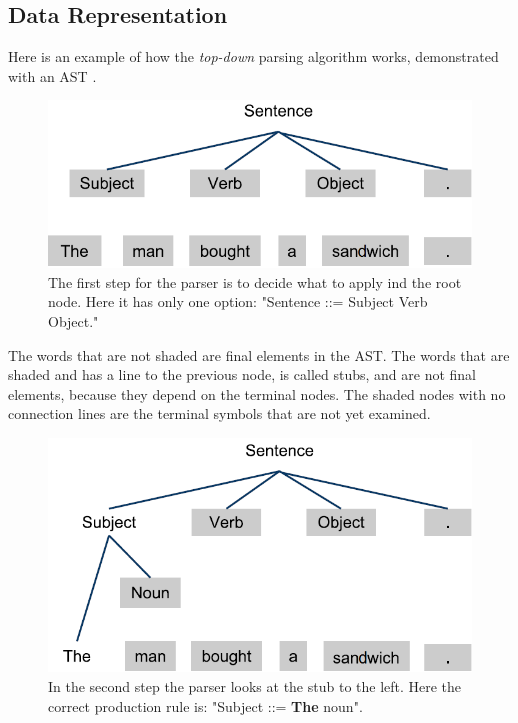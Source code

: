 \subsection{Data Representation}
\label{sec:asttheory}
Here is an example of how the \textit{top-down} parsing algorithm works, demonstrated with an AST \cite{misc:spo}.

\begin{figure}[H]
\begin{center}
\includegraphics[scale=0.5]{Images/parsingexample/AST1.png}
\end{center}
\caption{The first step for the parser is to decide what to apply ind the root node. Here it has only one option: "Sentence ::= Subject Verb Object."}
\end{figure}

The words that are not shaded are final elements in the AST. The words that are shaded and has a line to the previous node, is called stubs, and are not final elements, because they depend on the terminal nodes. The shaded nodes with no connection lines are the terminal symbols that are not yet examined.

\begin{figure}[H]
\begin{center}
\includegraphics[scale=0.5]{Images/parsingexample/AST2.png}
\end{center}
\caption{In the second step the parser looks at the stub to the left. Here the correct production rule is: "Subject ::= \textbf{The} noun".}
\label{fig:ast2}
\end{figure}

